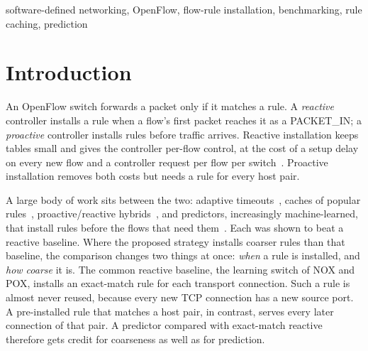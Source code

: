 \documentclass[conference]{IEEEtran}
\begin{document}
\begin{IEEEkeywords}
software-defined networking, OpenFlow, flow-rule installation, benchmarking, rule caching, prediction
\end{IEEEkeywords}

\section{Introduction}

An OpenFlow switch forwards a packet only if it matches a rule. A \emph{reactive} controller installs a rule when a flow's first packet reaches it as a PACKET\_IN; a \emph{proactive} controller installs rules before traffic arrives. Reactive installation keeps tables small and gives the controller per-flow control, at the cost of a setup delay on every new flow and a controller request per flow per switch~\cite{ethane,difane,devoflow}. Proactive installation removes both costs but needs a rule for every host pair.

A large body of work sits between the two: adaptive timeouts~\cite{smarttime,ahihta}, caches of popular rules~\cite{cacheflow}, proactive/reactive hybrids~\cite{pard,kim2022}, and predictors, increasingly machine-learned, that install rules before the flows that need them~\cite{batista2024,rouf2025}. Each was shown to beat a reactive baseline. Where the proposed strategy installs coarser rules than that baseline, the comparison changes two things at once: \emph{when} a rule is installed, and \emph{how coarse} it is. The common reactive baseline, the learning switch of NOX and POX, installs an exact-match rule for each transport connection. Such a rule is almost never reused, because every new TCP connection has a new source port. A pre-installed rule that matches a host pair, in contrast, serves every later connection of that pair. A predictor compared with exact-match reactive therefore gets credit for coarseness as well as for prediction.
\end{document}

